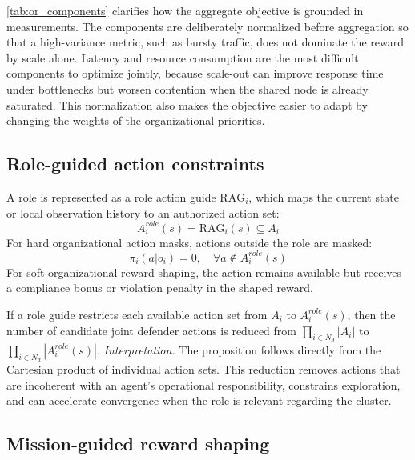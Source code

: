 \documentclass[journal]{IEEEtran}
\newcommand{\rag}{\mathrm{RAG}}
\begin{document}
\autoref{tab:or_components} clarifies how the aggregate objective is grounded in measurements. The components are deliberately normalized before aggregation so that a high-variance metric, such as bursty traffic, does not dominate the reward by scale alone. Latency and resource consumption are the most difficult components to optimize jointly, because scale-out can improve response time under bottlenecks but worsen contention when the shared node is already saturated. This normalization also makes the objective easier to adapt by changing the weights of the organizational priorities.

\subsection{Role-guided action constraints}
\label{subsec:role_constraints}

A role is represented as a role action guide $\rag_i$, which maps the current state or local observation history to an authorized action set:
\[
  A_i^{role}(s)=\rag_i(s)\subseteq A_i
\]
For hard organizational action masks, actions outside the role are masked:
\begin{equation}
  \pi_i(a|o_i)=0,\quad \forall a\notin A_i^{role}(s)
  \label{eq:hard_mask}
\end{equation}
For soft organizational reward shaping, the action remains available but receives a compliance bonus or violation penalty in the shaped reward.

If a role guide restricts each available action set from $A_i$ to $A_i^{role}(s)$, then the number of candidate joint defender actions is reduced from $\prod_{i\in N_d}|A_i|$ to $\prod_{i\in N_d}|A_i^{role}(s)|$. \textit{Interpretation.} The proposition follows directly from the Cartesian product of individual action sets. This reduction removes actions that are incoherent with an agent's operational responsibility, constrains exploration, and can accelerate convergence when the role is relevant regarding the cluster.

\subsection{Mission-guided reward shaping}
\label{subsec:mission_rewards}
\end{document}
